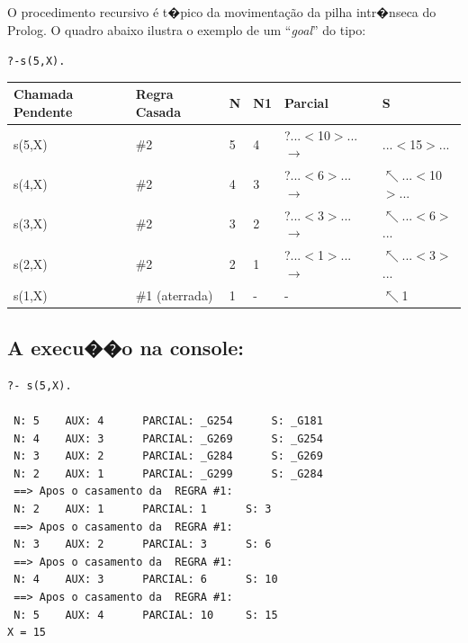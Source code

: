 \documentclass[final,a4paper]{article}
\begin{document}


O procedimento recursivo \'{e} t�pico da movimenta\c{c}\~{a}o da pilha
intr�nseca do Prolog. O quadro abaixo ilustra o exemplo de um
``\emph{goal}'' do tipo:

\texttt{?-s(5,X).}

{\small
\begin{center}
\begin{tabular}
[c]{|l|l|l|l|l|l|}\hline
\textbf{Chamada Pendente} & \textbf{Regra Casada} & \textbf{N} & \textbf{N1} &
\textbf{Parcial} & \textbf{S}\\\hline
s(5,X) & \#2 & 5 & 4 & ?...$<$10$>$... $\rightarrow$ & ...$<$15$>$...\\ \hline
s(4,X) & \#2 & 4 & 3 & ?...$<$6$>$... $\rightarrow$ &
$\nwarrow$...$<$10$>$...\\ \hline
s(3,X) & \#2 & 3 & 2 & ?...$<$3$>$... $\rightarrow$ &
$\nwarrow$...$<$6$>$...\\ \hline
s(2,X) & \#2 & 2 & 1 & ?...$<$1$>$... $\rightarrow$ &
$\nwarrow$...$<$3$>$...\\ \hline
s(1,X) & \#1 (aterrada) & 1 & - & - & $\nwarrow$1\\\hline
\end{tabular}
\end{center}
}

\newpage
\subsection{A execu��o na console:}


\begin{lstlisting}
?- s(5,X).

 N: 5 	 AUX: 4 	 PARCIAL: _G254 	 S: _G181
 N: 4 	 AUX: 3 	 PARCIAL: _G269 	 S: _G254
 N: 3 	 AUX: 2 	 PARCIAL: _G284 	 S: _G269
 N: 2 	 AUX: 1 	 PARCIAL: _G299 	 S: _G284
 ==> Apos o casamento da  REGRA #1:
 N: 2 	 AUX: 1 	 PARCIAL: 1 	 S: 3
 ==> Apos o casamento da  REGRA #1:
 N: 3 	 AUX: 2 	 PARCIAL: 3 	 S: 6
 ==> Apos o casamento da  REGRA #1:
 N: 4 	 AUX: 3 	 PARCIAL: 6 	 S: 10
 ==> Apos o casamento da  REGRA #1:
 N: 5 	 AUX: 4 	 PARCIAL: 10 	 S: 15
X = 15 
\end{lstlisting}
\end{document}
